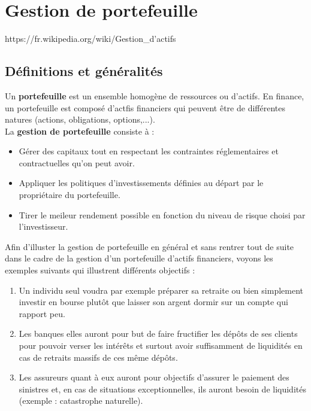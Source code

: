 \section{Gestion de portefeuille}
https://fr.wikipedia.org/wiki/Gestion\_d'actifs

\subsection{Définitions et généralités}

Un \textbf{portefeuille} est un ensemble homogène de ressources ou d'actifs. En finance, un portefeuille est composé d'actfis financiers qui peuvent être de différentes natures (actions, obligations, options,...).\\

La \textbf{gestion de portefeuille} consiste à :
\begin{itemize}
 \item Gérer des capitaux tout en respectant les contraintes réglementaires et contractuelles qu'on peut avoir.
 \item Appliquer les politiques d'investissements définies au départ par le propriétaire du portefeuille.
 \item Tirer le meileur rendement possible en fonction du niveau de risque choisi par l'investisseur.
\end{itemize}

Afin d'illuster la gestion de portefeuille en général et sans rentrer tout de suite dans le cadre de la gestion d'un portefeuille d'actifs financiers, voyons les exemples suivants qui illustrent différents objectifs :
\begin{enumerate}
 \item Un individu seul voudra par exemple préparer sa retraite ou bien simplement investir en bourse plutôt que laisser son argent dormir sur un compte qui rapport peu.
 \item Les banques elles auront pour but de faire fructifier les dépôts de ses clients pour pouvoir verser les intérêts et surtout avoir suffisamment de liquidités en cas de retraits massifs de ces même dépôts.
 \item Les assureurs quant à eux auront pour objectifs d'assurer le paiement des sinistres et, en cas de situations exceptionnelles, ils auront besoin de liquidités (exemple : catastrophe naturelle).
\end{enumerate}


